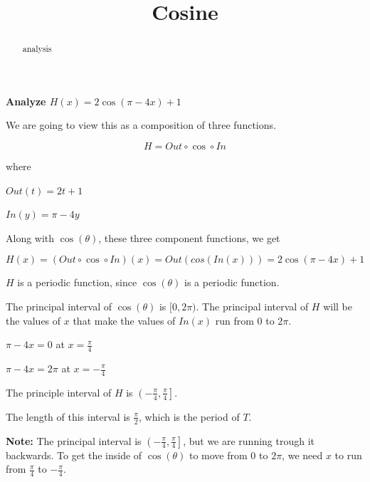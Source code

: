 \documentclass{ximera}
\title{Cosine}
\begin{document}
\begin{abstract}
analysis
\end{abstract}
\maketitle












\textbf{\textcolor{purple!85!blue}{Analyze  $H(x) =  2 \cos(\pi - 4x) + 1$}}





\begin{template}


We are going to view this as a composition of three functions.


\[
H = Out \circ \cos \circ In
\]


where


$Out(t) = 2t + 1$ 


$In(y) = \pi - 4y$ 




Along with $\cos(\theta)$, these three component functions, we get



\[
H(x) = (Out \circ \cos \circ In)(x) = Out(cos(In(x)))  = 2 \cos(\pi - 4x) + 1
\]




\end{template}

$H$ is a periodic function, since $\cos(\theta)$ is a periodic function. 

The principal interval of $\cos(\theta)$ is $[0, 2\pi)$.  The principal interval of $H$ will be the values of $x$ that make the values of $In(x)$ run from $0$ to $2\pi$. 


$\pi - 4x = 0$ at $x = \frac{\pi}{4}$

$\pi - 4x = 2\pi$ at $x = -\frac{\pi}{4}$

The principle interval of $H$ is $\left( -\frac{\pi}{4}, \frac{\pi}{4} \right]$. 

The length of this interval is $\frac{\pi}{2}$, which is the period of $T$. 


\textbf{Note:}  The principal interval is $\left( -\frac{\pi}{4}, \frac{\pi}{4} \right]$, but we are running trough it backwards.  To get the inside of $\cos(\theta)$ to move from $0$ to $2\pi$, we need $x$ to run from $\frac{\pi}{4}$ to $-\frac{\pi}{4}$.
\end{document}
